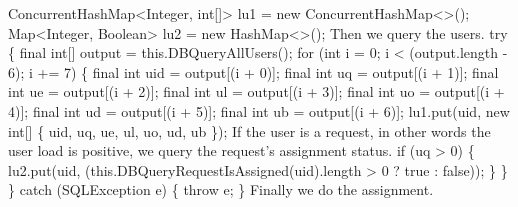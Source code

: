 \nwendcode{}
\nwenddocs{}\plusendmoddef
  ConcurrentHashMap<Integer, int[]> lu1 = new ConcurrentHashMap<>();
  Map<Integer, Boolean>             lu2 = new HashMap<>();
\nwendcode{}\nwdocspar
{\small Then we query the users.}
\nwenddocs{}\plusendmoddef
  try \{
    final int[] output = this.DBQueryAllUsers();
    for (int i = 0; i < (output.length - 6); i += 7) \{
      final int uid = output[(i + 0)];
      final int  uq = output[(i + 1)];
      final int  ue = output[(i + 2)];
      final int  ul = output[(i + 3)];
      final int  uo = output[(i + 4)];
      final int  ud = output[(i + 5)];
      final int  ub = output[(i + 6)];
      lu1.put(uid, new int[] \{ uid, uq, ue, ul, uo, ud, ub \});
\nwendcode{}\nwdocspar
{\small If the user is a request, in other words the user load is positive,
we query the request's assignment status.}
\nwenddocs{}\plusendmoddef
      if (uq > 0) \{
        lu2.put(uid, (this.DBQueryRequestIsAssigned(uid).length > 0 ? true : false));
      \}
    \}
  \} catch (SQLException e) \{
    throw e;
  \}
\nwendcode{}\nwdocspar
{\small Finally we do the assignment.}
\nwenddocs{}\plusendmoddef
